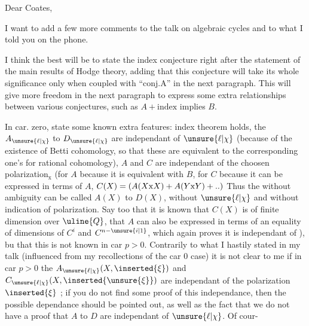 Dear Coates,

I want to add a few more comments to the talk on algebraic cycles and to what I told you on the phone.

I think the best will be to state the index conjecture right after the statement of the main results of Hodge theory, adding that this conjecture will take its whole significance only when coupled with ``conj.A'' in the next paragraph. This will give more freedom in the next paragraph to express some extra relationships between various conjectures, such as $A+\text{index}$ implies $B$.

In car. zero, state some known extra features: index theorem holds, the  $A_{\unsure{\ell|\chi}}$ to $D_{\unsure{\ell|\chi}}$ are independant of $\unsure{\ell|\chi}$ (because of the existence of Betti cohomology, so that these  are equivalent to the corresponding one's for rational cohomology),  $A$ and $C$ are independant of the choosen polarization$_{\mathrm{x}}$ (for $A$ because it is equivalent with $B$, for $C$ because it can be expressed in terms of $A$, $C(X)=(A(X\mathrm{x}X)+A(Y\mathrm{x}Y)+\mathinner{..})$ Thus the  without ambiguity can be called $A(X)$ to $D(X)$, without  $\unsure{\ell|\chi}$ and without indication of polarization. Say too that it is known that $C(X)$ is of finite dimension over $\uline{Q}$, \inserted{(} that $A$ can also be expressed in terms of an equality of dimensions of $C^i$ and $C^{n-\unsure{i|1}}$\deleted{)}, which again proves it is independant of \hspace{1em}), bu that this is not known in car $p>0$. Contrarily to what I hastily stated in my talk (influenced from my recollections of the car $0$ case) it is not clear to me if in car $p>0$ the   $A_{\unsure{\ell|\chi}}(X,\inserted{\xi})$ and $C_{\unsure{\ell|\chi}}(X,\inserted{\unsure{\xi}})$ are independant of the polarization $\inserted{\xi}$ ; if you do not find some proof of this independance, then the possible dependance should be pointed out, as well as the fact that  we do not have a proof that $A$ to $D$ are independant of $\unsure{\ell|\chi}$. Of cour-
